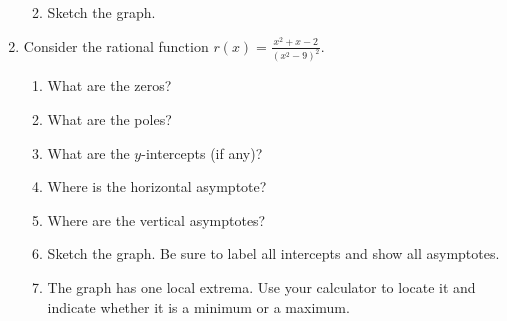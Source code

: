 \documentclass[letterpaper,12pt,fleqn]{article}
\begin{document}
\begin{enumerate}
\begin{enumerate}
    \vspace{1in}

  \item Sketch the graph.

    \bigskip

    \begin{figure}[h]
      \setlength{\leftskip}{1in}
    \end{figure}
  \end{enumerate}

  \newpage

\item Consider the rational function $r(x)=\frac{x^2+x-2}{(x^2-9)^2}$.
  \begin{enumerate}
  \item What are the zeros?

    \vspace{0.5in}
    
  \item What are the poles?

    \vspace{0.5in}

  \item What are the $y$-intercepts (if any)?

    \vspace{1in}

  \item Where is the horizontal asymptote?

    \vspace{0.5in}

  \item Where are the vertical asymptotes?

    \vspace{0.5in}

  \item Sketch the graph. Be sure to label all intercepts and show all
    asymptotes.

    \bigskip

    \begin{figure}[h]
      \setlength{\leftskip}{1in}
    \end{figure}
    
  \item The graph has one local extrema. Use your calculator to locate it and
    indicate whether it is a minimum or a maximum.
  \end{enumerate}
\end{enumerate}
\end{document}
